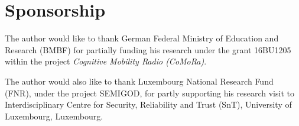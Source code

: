 \chapter*{Sponsorship}

The author would like to thank German Federal Ministry of Education and Research (BMBF) for partially funding his research under the grant 16BU1205 within the project \textit{Cognitive Mobility Radio (CoMoRa)}.

The author would also like to thank Luxembourg National Research Fund (FNR), under the project SEMIGOD, for partly supporting his research visit to Interdisciplinary Centre for Security, Reliability and Trust (SnT), University of Luxembourg, Luxembourg. 
